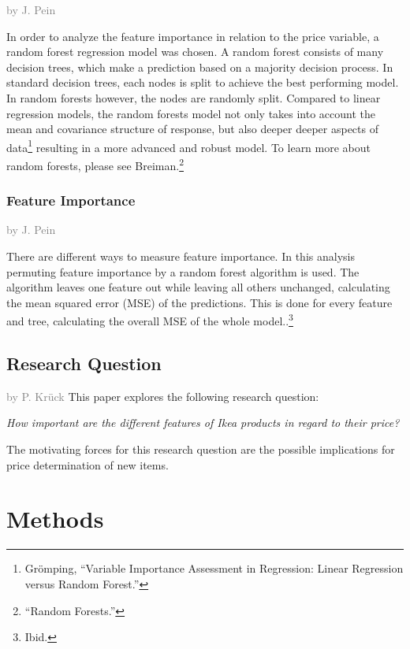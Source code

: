 \documentclass[a4paper, nobind]{templates/ociamthesis}
\begin{document}
\textcolor{gray}{by J. Pein}

In order to analyze the feature importance in relation to the price variable, a random forest regression model was chosen. A random forest consists of many decision trees, which make a prediction based on a majority decision process. In standard decision trees, each nodes is split to achieve the best performing model. In random forests however, the nodes are randomly split. Compared to linear regression models, the random forests model not only takes into account the mean and covariance structure of response, but also deeper deeper aspects of data\footnote{Grömping, ``Variable Importance Assessment in Regression: Linear Regression versus Random Forest.''} resulting in a more advanced and robust model. To learn more about random forests, please see Breiman.\footnote{``Random Forests.''}

\hypertarget{feature-importance}{%
\subsection{Feature Importance}\label{feature-importance}}

\textcolor{gray}{by J. Pein}

There are different ways to measure feature importance. In this analysis permuting feature importance by a random forest algorithm is used. The algorithm leaves one feature out while leaving all others unchanged, calculating the mean squared error (MSE) of the predictions. This is done for every feature and tree, calculating the overall MSE of the whole model..\footnote{Ibid.}

\hypertarget{research_question}{%
\section{Research Question}\label{research_question}}

\textcolor{gray}{by P. Krück}
This paper explores the following research question:

\emph{How important are the different features of Ikea products in regard to their price?}

The motivating forces for this research question are the possible implications for price determination of new items.

\hypertarget{methods}{%
\chapter{Methods}\label{methods}}
\end{document}
